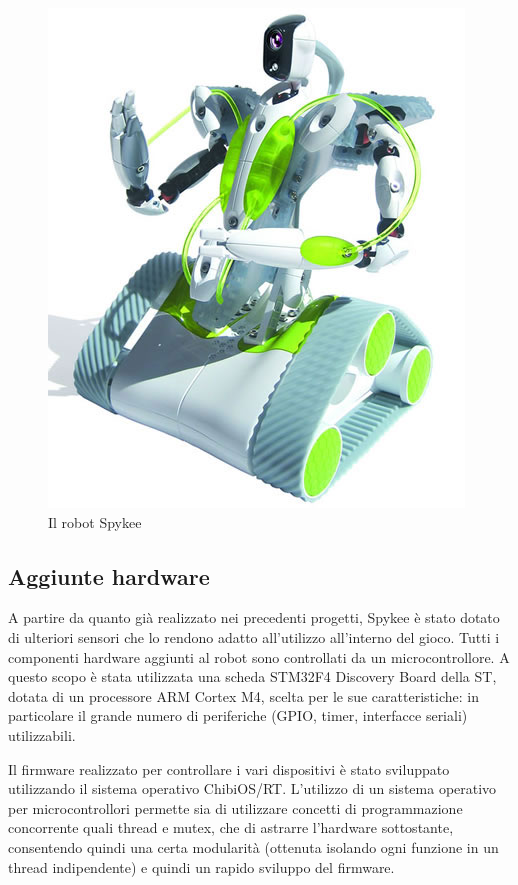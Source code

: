 \begin{figure}[h]
\centering
\includegraphics[scale=0.5]{images/spykee}
\caption{Il robot Spykee}
\end{figure}
\subsection*{Aggiunte hardware}
A partire da quanto già realizzato nei precedenti progetti, Spykee è stato dotato di ulteriori sensori che lo rendono adatto all'utilizzo all'interno del gioco. Tutti i componenti hardware aggiunti al robot sono controllati da un microcontrollore. A questo scopo è stata utilizzata una scheda STM32F4 Discovery Board della ST\cite{st}, dotata di un processore ARM Cortex M4, scelta per le sue caratteristiche: in particolare il grande numero di periferiche (GPIO, timer, interfacce seriali) utilizzabili.

Il firmware realizzato per controllare i vari dispositivi è stato sviluppato utilizzando il sistema operativo ChibiOS/RT\cite{chibios}. L'utilizzo di un sistema operativo per microcontrollori permette sia di utilizzare concetti di programmazione concorrente quali thread e mutex, che di astrarre l'hardware sottostante, consentendo quindi una certa modularità (ottenuta isolando ogni funzione in un thread indipendente) e quindi un rapido sviluppo del firmware.


